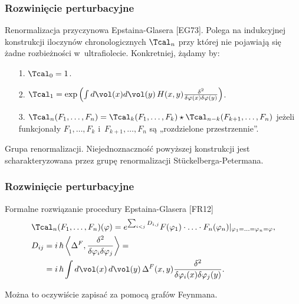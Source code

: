 \documentclass[10pt,t]{beamer}
\begin{document}
\begin{frame}
  \frametitle{Rozwinięcie perturbacyjne}


  Renormalizacja przyczynowa Epstaina-Glasera [EG73].
  Polega na indukcyjnej konstrukcji iloczynów chronologicznych $\Tcal_{ n }$
  przy której nie pojawiają się żadne rozbieżności w~ultrafiolecie.
  Konkretniej, żądamy by:
  \begin{itemize}
    \RaggedRight

  \item[1.] $\Tcal_{ 0 } = 1$.

  \item[2.] $\Tcal_{ 1 } =
    \exp\left( \int d \vol( x ) d \vol( y ) \,
      H( x, y ) \frac{ \delta^{ 2 } }{ \delta \varphi( x ) \delta \varphi( y ) } \right)$.

  \item[3.] $\Tcal_{ n }( F_{ 1 }, \ldots, F_{ n } ) =
    \Tcal_{ k }( F_{ 1 }, \ldots, F_{ k } )
    \star \Tcal_{ n - k }( F_{ k + 1 },\ldots, F_{ n } )$
    jeżeli funkcjonały
    $F_{ 1 }, \ldots, F_{ k }$ i~$F_{ k + 1 }, \ldots, F_{ n }$ są
    „rozdzielone przestrzennie”.

  \end{itemize}



  Grupa renormalizacji.
  Niejednoznaczność powyższej konstrukcji jest scharakteryzowana
  przez grupę renormalizacji St\"{u}ckelberga-Petermana.

\end{frame}





\begin{frame}
  \frametitle{Rozwinięcie perturbacyjne}


  Formalne rozwiązanie procedury Epstaina-Glasera [FR12]
  \begin{subequations}
    \begin{align}
      \label{eq:Rachunek-zaburzen-17-A}
      &\Tcal_{ n }( F_{ 1 }, \ldots, F_{ n } )( \varphi ) =
      e^{ \sum_{ i < j } D_{ i, j } } F( \varphi_{ 1 } ) \cdot \ldots \cdot F_{ n }( \varphi_{ n } )
        |_{ \varphi_{ 1 } = \ldots = \varphi_{ n } = \varphi }, \\
      \label{eq:Rachunek-zaburzen-17-B}
      &D_{ i j } =
        i \, \hbar \left\langle \Delta^{ F }, \frac{ \delta^{ 2 } }{ \delta \varphi_{ i } \delta \varphi_{ j } }
        \right\rangle = \\
      &\hphantom{D_{ i j }} =
        i \, \hbar \int d \vol( x ) \, d \vol( y ) \, \Delta^{ F }( x, y )
        \frac{ \delta^{ 2 } }{ \delta \varphi_{ i }( x ) \delta \varphi_{ j }( y ) }.
    \end{align}
  \end{subequations}

  Można to oczywiście zapisać za pomocą grafów Feynmana.

\end{frame}
\end{document}
